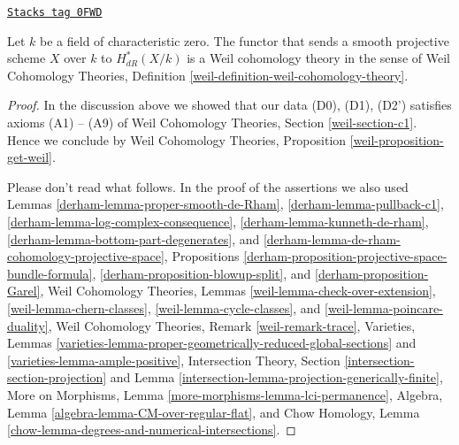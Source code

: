 \begin{proposition}
\label{derham-proposition-de-rham-is-weil}
\href{https://stacks.math.columbia.edu/tag/0FWD}{\texttt{Stacks tag 0FWD}}

Let $k$ be a field of characteristic zero. The functor that
sends a smooth projective scheme $X$ over $k$ to $H_{dR}^*(X/k)$
is a Weil cohomology theory in the sense of
Weil Cohomology Theories, Definition
\ref{weil-definition-weil-cohomology-theory}.
\end{proposition}

\begin{proof}

In the discussion above we showed that our data (D0), (D1), (D2')
satisfies axioms (A1) -- (A9) of Weil Cohomology Theories, Section
\ref{weil-section-c1}. Hence we conclude by
Weil Cohomology Theories, Proposition \ref{weil-proposition-get-weil}.

\medskip\noindent
Please don't read what follows. In the proof of the assertions we also used
Lemmas \ref{derham-lemma-proper-smooth-de-Rham},
\ref{derham-lemma-pullback-c1},
\ref{derham-lemma-log-complex-consequence},
\ref{derham-lemma-kunneth-de-rham},
\ref{derham-lemma-bottom-part-degenerates}, and
\ref{derham-lemma-de-rham-cohomology-projective-space},
Propositions
\ref{derham-proposition-projective-space-bundle-formula},
\ref{derham-proposition-blowup-split}, and
\ref{derham-proposition-Garel},
Weil Cohomology Theories, Lemmas
\ref{weil-lemma-check-over-extension},
\ref{weil-lemma-chern-classes},
\ref{weil-lemma-cycle-classes}, and
\ref{weil-lemma-poincare-duality},
Weil Cohomology Theories, Remark \ref{weil-remark-trace},
Varieties, Lemmas
\ref{varieties-lemma-proper-geometrically-reduced-global-sections} and
\ref{varieties-lemma-ample-positive},
Intersection Theory, Section \ref{intersection-section-projection} and
Lemma \ref{intersection-lemma-projection-generically-finite},
More on Morphisms, Lemma \ref{more-morphisms-lemma-lci-permanence},
Algebra, Lemma \ref{algebra-lemma-CM-over-regular-flat}, and
Chow Homology, Lemma
\ref{chow-lemma-degrees-and-numerical-intersections}.
\end{proof}

